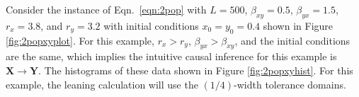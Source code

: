 Consider the instance of Eqn.\ \ref{eqn:2pop} with $L=500$, $\beta_{xy} = 0.5$, $\beta_{yx} = 1.5$, $r_x = 3.8$, and $r_y = 3.2$ with initial conditions $x_0 = y_0 = 0.4$ shown in Figure \ref{fig:2popxyplot}.  For this example, $r_x>r_y$, $\beta_{yx}>\beta_{xy}$, and the initial conditions are the same, which implies the intuitive causal inference for this example is $\mathbf{X}\rightarrow\mathbf{Y}$.  The histograms of these data shown in Figure \ref{fig:2popxyhist}.  For this example, the leaning calculation will use the $(1/4)$-width tolerance domains.
